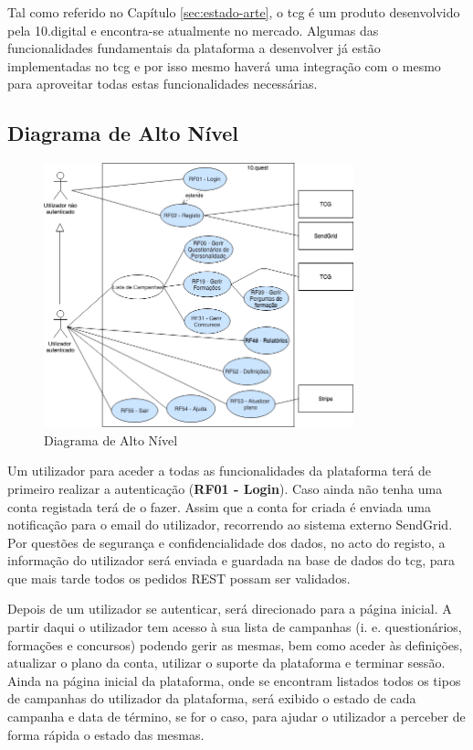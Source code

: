 Tal como referido no Capítulo \ref{sec:estado-arte}, o \acrshort{tcg} é um produto desenvolvido pela 10.digital e encontra-se atualmente no mercado. Algumas das funcionalidades fundamentais da plataforma a desenvolver já estão implementadas no \acrshort{tcg}  e por isso mesmo haverá uma integração com o mesmo para aproveitar todas estas funcionalidades necessárias.


\newpage

\subsection{Diagrama de Alto Nível}
\label{d:altonivel}
\begin{figure}[ht!]
	\begin{center}
		\includegraphics[width=0.8\textwidth]{img/rf/alto-nivel}
		\caption{Diagrama de Alto Nível}
		\label{fig:rf-alto-nivel}
	\end{center}
\end{figure}

Um utilizador para aceder a todas as funcionalidades da plataforma terá de primeiro realizar a autenticação (\textbf{RF01 - Login}). Caso ainda não tenha uma conta registada terá de o fazer. Assim que a conta for criada é enviada uma notificação para o email do utilizador, recorrendo ao sistema externo SendGrid. Por questões de segurança e confidencialidade dos dados, no acto do registo, a informação do utilizador será enviada e guardada na base de dados do \acrshort{tcg}, para que mais tarde todos os pedidos REST possam ser validados.

Depois de um utilizador se autenticar, será direcionado para a página inicial. A partir daqui o utilizador tem acesso à sua lista de campanhas (i. e. questionários, formações e concursos) podendo gerir as mesmas, bem como aceder às definições, atualizar o plano da conta, utilizar o suporte da plataforma e terminar sessão.
Ainda na página inicial da plataforma, onde se encontram listados todos os tipos de campanhas do utilizador da plataforma, será exibido o estado de cada campanha e data de término, se for o caso, para ajudar o utilizador a perceber de forma rápida o estado das mesmas.

